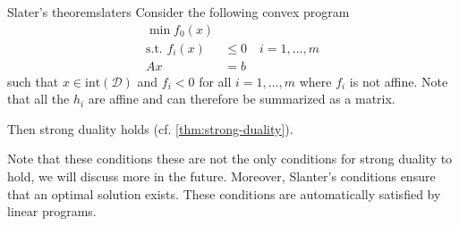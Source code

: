 \documentclass[12pt]{extarticle}
\begin{document}
\begin{theorem}{Slater's theorem}{slaters}
	Consider the following convex program
	\begin{align}
		\min f_0(x)         &                              \\
		\text{s.t. }	f_i(x) & \leq 0 \quad i = 1, \dots, m \\
		A x                 & = b
	\end{align}
	such that $x \in \mathrm{int}(\mathcal D)$ and $f_i \lt 0$ for all $i = 1, \dots, m$ where
	$f_i$ is not affine.
	Note that all the $h_i$ are affine and can therefore be summarized as a matrix.

	Then strong duality holds (cf. \cref{thm:strong-duality}).
\end{theorem}

Note that these conditions these are not the only conditions for strong duality to hold, we will
discuss more in the future.
Moreover, Slanter's conditions ensure that an optimal solution exists.
These conditions are automatically satisfied by linear programs.
\end{document}
